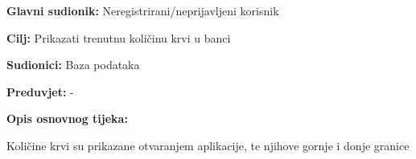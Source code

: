 \noindent {}
					\begin{packed_item}
	
						\item \textbf{Glavni sudionik: }Neregistrirani/neprijavljeni korisnik
						\item \textbf{Cilj:} Prikazati trenutnu količinu krvi u banci
						\item \textbf{Sudionici:} Baza podataka
						\item \textbf{Preduvjet:} -
						\item \textbf{Opis osnovnog tijeka:}
						
						\item[] \begin{packed_enum}
	
							\item Količine krvi su prikazane otvaranjem aplikacije, te njihove gornje i donje granice
							
						\end{packed_enum}

					\end{packed_item}

